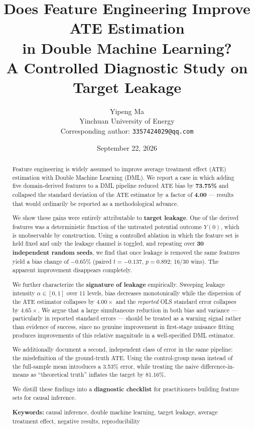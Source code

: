 \documentclass[11pt]{article}
\title{\bfseries Does Feature Engineering Improve ATE Estimation\\ in Double Machine Learning?\\[0.4em]
\large A Controlled Diagnostic Study on Target Leakage}
\author{Yipeng Ma\\\small Yinchuan University of Energy\\[0.25em]
\small Corresponding author: \texttt{3357424029@qq.com}}
\date{September 22, 2026}
\begin{document}
\maketitle

\begin{abstract}
\noindent
Feature engineering is widely assumed to improve average treatment effect (ATE) estimation with Double Machine Learning (DML). We report a case in which adding five domain-derived features to a DML pipeline reduced ATE bias by \textbf{73.75\%} and collapsed the standard deviation of the ATE estimator by a factor of \textbf{4.00} --- results that would ordinarily be reported as a methodological advance.

We show these gains were entirely attributable to \textbf{target leakage}. One of the derived features was a deterministic function of the untreated potential outcome $Y(0)$, which is unobservable by construction. Using a controlled ablation in which the feature set is held fixed and only the leakage channel is toggled, and repeating over \textbf{30 independent random seeds}, we find that once leakage is removed the same features yield a bias change of \textbf{$-0.65\%$} (paired $t = -0.137$, $p = 0.892$; 16/30 wins). The apparent improvement disappears completely.

We further characterize the \textbf{signature of leakage} empirically. Sweeping leakage intensity $\alpha \in [0,1]$ over 11 levels, bias decreases monotonically while the dispersion of the ATE estimator collapses by $4.00\times$ and the \emph{reported} OLS standard error collapses by $4.65\times$. We argue that a large simultaneous reduction in both bias and variance --- particularly in reported standard errors --- should be treated as a warning signal rather than evidence of success, since no genuine improvement in first-stage nuisance fitting produces improvements of this relative magnitude in a well-specified DML estimator.

We additionally document a second, independent class of error in the same pipeline: the misdefinition of the ground-truth ATE. Using the control-group mean instead of the full-sample mean introduces a 3.53\% error, while treating the naive difference-in-means as ``theoretical truth'' inflates the target by 81.16\%.

We distill these findings into a \textbf{diagnostic checklist} for practitioners building feature sets for causal inference.

\medskip
\noindent\textbf{Keywords:} causal inference, double machine learning, target leakage, average treatment effect, negative results, reproducibility
\end{abstract}
\end{document}
